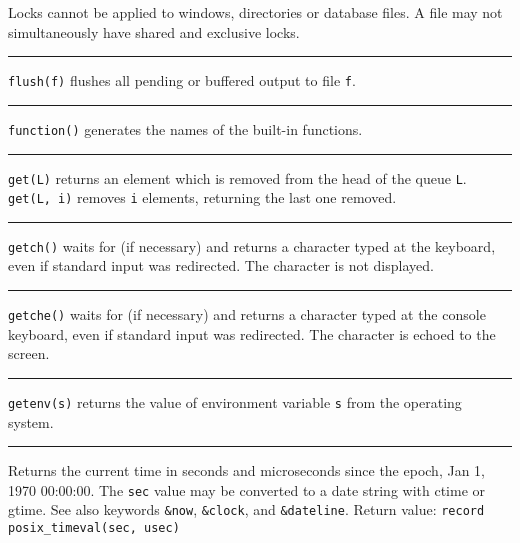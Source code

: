 Locks cannot be applied to windows, directories or database files. A
file may not simultaneously have shared and exclusive locks.

\bigskip\hrule\vspace{0.1cm}

\noindent
{}\texttt{flush(f)} flushes all pending or buffered output
to file \texttt{f}.

\bigskip\hrule\vspace{0.1cm}

\noindent
\texttt{function()} generates the names of the built-in functions.

\bigskip\hrule\vspace{0.1cm}

\noindent
\texttt{get(L)} returns an element which is removed from the head of the
queue \texttt{L}. \texttt{get(L, i)} removes \texttt{i}
elements, returning the last one removed.

\bigskip\hrule\vspace{0.1cm}

\noindent
\texttt{getch()} waits for (if necessary) and returns a character typed
at the keyboard, even if standard input was redirected.
The character is not displayed.

\bigskip\hrule\vspace{0.1cm}

\noindent
\texttt{getche()} waits for (if necessary) and returns a character typed
at the console keyboard, even if standard input was redirected. The
character is echoed to the screen.

\bigskip\hrule\vspace{0.1cm}

\noindent
\texttt{getenv(s)} returns the value of environment variable \texttt{s} from the operating system.

\bigskip\hrule\vspace{0.1cm}

\noindent
{}Returns the current time in seconds and microseconds
since the epoch, Jan 1, 1970 00:00:00. The \texttt{sec} value may be
converted to a date string with ctime or gtime. See also keywords
\texttt{\&now}, \texttt{\&clock}, and \texttt{\&dateline}. Return
value: \texttt{record posix\_timeval(sec, usec)} 

